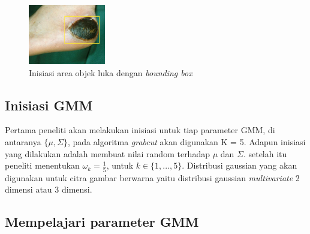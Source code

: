 \begin{figure}[H]
	\centering{}
    \includegraphics[width=0.3\textwidth]{gambar/rectangle.png}
	\caption{Inisiasi area objek luka dengan \emph{bounding box}}
\end{figure}

\subsection{Inisiasi GMM}

Pertama peneliti akan melakukan inisiasi untuk tiap parameter GMM, di antaranya 
\(\{\mu, \Sigma \}\), pada algoritma \emph{grabcut} akan digunakan K = 5. Adapun
inisiasi yang dilakukan adalah membuat nilai random terhadap \(\mu\) dan \(\Sigma\).
setelah itu peneliti menentukan \(\omega_k = \frac{1}{5}\), untuk \(k \in \{1, ..., 5\}\).
Distribusi gaussian yang akan digunakan untuk citra gambar berwarna yaitu distribusi 
gaussian \emph{multivariate} 2 dimensi atau 3 dimensi.


\subsection{Mempelajari parameter GMM}


